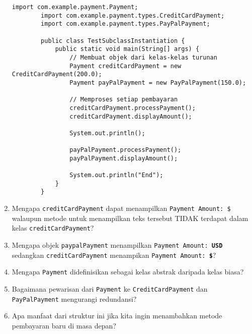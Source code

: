 \begin{enumerate}
\begin{lstlisting}[style=JavaStyle, caption={TestSubclassInstantiation.java}]
		import com.example.payment.Payment;
		import com.example.payment.types.CreditCardPayment;
		import com.example.payment.types.PayPalPayment;
		
		public class TestSubclassInstantiation {
			public static void main(String[] args) {
				// Membuat objek dari kelas-kelas turunan
				Payment creditCardPayment = new CreditCardPayment(200.0);
				Payment payPalPayment = new PayPalPayment(150.0);
				
				// Memproses setiap pembayaran
				creditCardPayment.processPayment();
				creditCardPayment.displayAmount();
				
				System.out.println();
				
				payPalPayment.processPayment();
				payPalPayment.displayAmount();
				
				System.out.println("End");
			}
		}
	\end{lstlisting}
	\begin{tcolorbox}[colback=white, colframe=black,  width=\linewidth, height=3cm,  boxrule=1pt, sharp corners]
	\end{tcolorbox}
	\item Mengapa \texttt{creditCardPayment} dapat menampilkan \texttt{Payment Amount: \$} walaupun metode untuk menampilkan teks tersebut TIDAK terdapat dalam kelas \texttt{creditCardPayment}?
	\begin{tcolorbox}[colback=white, colframe=black,  width=\linewidth, height=3cm,  boxrule=1pt, sharp corners]
	\end{tcolorbox}
	\item Mengapa objek \texttt{paypalPayment} menampilkan \texttt{Payment Amount: \textbf{USD}} sedangkan \texttt{creditCardPayment} menampikan \texttt{Payment Amount: \textbf{\$}}?
	\begin{tcolorbox}[colback=white, colframe=black,  width=\linewidth, height=3cm,  boxrule=1pt, sharp corners]
	\end{tcolorbox}
	\item Mengapa \texttt{Payment} didefinisikan sebagai kelas abstrak daripada kelas biasa?
	\begin{tcolorbox}[colback=white, colframe=black,  width=\linewidth, height=3cm,  boxrule=1pt, sharp corners]
	\end{tcolorbox}
	\item Bagaimana pewarisan dari \texttt{Payment} ke \texttt{CreditCardPayment} dan \texttt{PayPalPayment} mengurangi redundansi?
	\begin{tcolorbox}[colback=white, colframe=black,  width=\linewidth, height=3cm,  boxrule=1pt, sharp corners]
	\end{tcolorbox}
	\item Apa manfaat dari struktur ini jika kita ingin menambahkan metode pembayaran baru di masa depan?
	\begin{tcolorbox}[colback=white, colframe=black,  width=\linewidth, height=3cm,  boxrule=1pt, sharp corners]
	\end{tcolorbox}
\end{enumerate}

